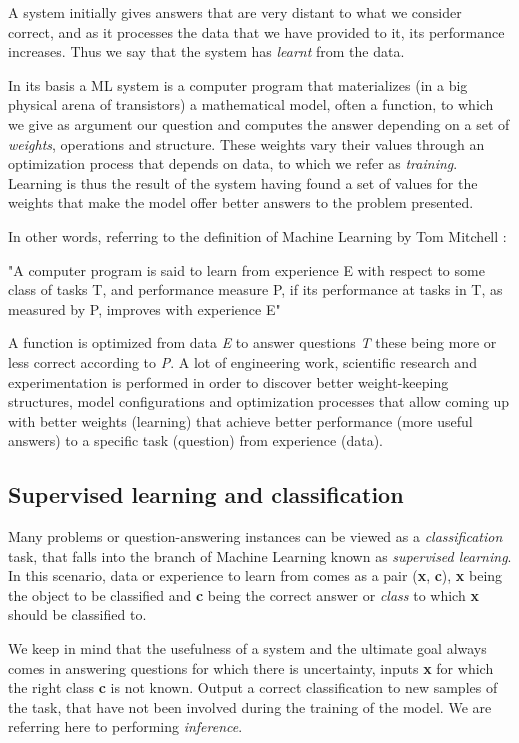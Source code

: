 \documentclass[11pt,english,listoffigures,listoftables]{tfgetsinf}
\begin{document}
A system initially gives answers that are very distant to what we consider correct, and as it processes the data that we have provided to it, its performance increases. Thus we say that the system has \textit{learnt} from the data.

In its basis a ML system is a computer program that materializes (in a big physical arena of transistors) a mathematical model, often a function, to which we give as argument our question and computes the answer depending on a set of \textit{weights}, operations and structure. These weights vary their values through an optimization process that depends on data, to which we refer as \textit{training}. Learning is thus the result of the system having found a set of values for the weights that make the model offer better answers to the problem presented.

In other words, referring to the definition of Machine Learning by Tom Mitchell \cite{BookTM}: 

"A computer program is said to learn from experience E with respect to some class of tasks T, and performance measure P, if its performance at tasks in T, as measured by P, improves with experience E"

A function is optimized from data \textit{E} to answer questions \textit{T} these being more or less correct according to \textit{P}.
A lot of engineering work, scientific research and experimentation is performed in order to discover better weight-keeping structures, model configurations and optimization processes that allow coming up with better weights (learning) that achieve better performance (more useful answers) to a specific task (question) from experience (data). 

\subsection{Supervised learning and classification}\label{sl}
Many problems or question-answering instances can be viewed as a \textit{classification} task, that falls into the branch of Machine Learning known as \textit{supervised learning}. In this scenario, data or experience to learn from comes as a pair (\textbf{x}, \textbf{c}), \textbf{x} being the object to be classified and \textbf{c} being the correct answer or \textit{class} to which \textbf{x} should be classified to.

We keep in mind that the usefulness of a system and the ultimate goal always comes in answering questions for which there is uncertainty, inputs \textbf{x} for which the right class \textbf{c} is not known. 
Output a correct classification to new samples of the task, that have not been involved during the training of the model.
We are referring here to performing \textit{inference}.
\end{document}
